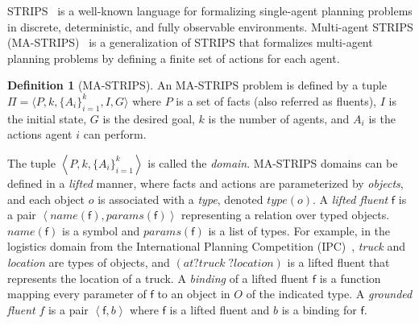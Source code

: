 \documentclass[letterpaper]{article} %
\theoremstyle{definition}
\newtheorem{definition}{Definition}
\theoremstyle{remark}
\newcommand{\tuple}[1]{\ensuremath{\left \langle #1 \right \rangle }}
\newcommand{\params}{\textit{params}}
\newcommand{\name}{\textit{name}}
\newcommand{\type}{\textit{type}}
\newcommand{\liftf}{\mathsf{f}}
\begin{document}
STRIPS~ is a well-known language for formalizing single-agent planning problems in discrete, deterministic, and fully observable environments.
Multi-agent STRIPS (MA-STRIPS)~\cite{brafman2008one} is a generalization of STRIPS that formalizes multi-agent planning problems by defining a finite set of actions for each agent. %
\begin{definition}[MA-STRIPS]
An MA-STRIPS problem is defined by a tuple $\Pi=\langle P, k, \{A_i\}_{i=1}^k, I, G \rangle$ where $P$ is a set of facts (also referred as fluents), $I$ is the initial state, $G$ is the desired goal, $k$ is the number of agents, and $A_i$ is the actions agent $i$ can perform.
\label{def:ma-strips}
\end{definition}
The tuple $\tuple{P,k,\{A_i\}_{i=1}^k}$ is called the \emph{domain}.
MA-STRIPS domains can be defined in a \emph{lifted} manner, where facts and actions are parameterized by \emph{objects}, and each object $o$ is associated with a \emph{type}, denoted $\type(o)$.
A \emph{lifted fluent} $\liftf$ is a pair $\tuple{\name(
\liftf), \params(\liftf)}$ representing a relation over typed objects. $\name(\liftf)$ is a symbol and $\params(\liftf)$ is a list of types.
For example, in the logistics domain from the International Planning Competition (IPC)~\cite{ipc}, \emph{truck} and \emph{location} are types of objects, and $(at ?truck\; ?location)$ is a lifted fluent that represents the location of a truck. %
A \emph{binding} of a lifted fluent $\liftf$ is a function %
mapping every parameter of $\liftf$ to an object in $O$ of the indicated type.
A \emph{grounded fluent} $f$ is a pair $\tuple{\liftf, b}$ where $\liftf$ is a lifted fluent
and $b$ is a binding for $\liftf$.
\end{document}
